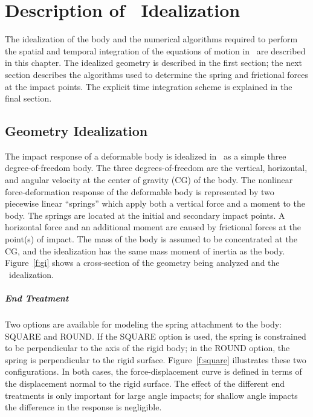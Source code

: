 \chapter{Description of \SLAP\ Idealization}\label{theory}

The idealization of the body and the numerical algorithms required to
perform the spatial and temporal integration of the equations of
motion in \SLAP\ are described in this chapter. The idealized geometry
is described in the first section; the next section describes the
algorithms used to determine the spring and frictional forces at the
impact points.  The explicit time integration scheme is explained in
the final section.

\section{Geometry Idealization}\label{s:ideal}

The impact response of a deformable body is idealized in \SLAP\ as a
simple three degree-of-freedom body.  The three degrees-of-freedom are
the vertical, horizontal, and angular velocity at the center of
gravity (CG) of the body.  The nonlinear force-deformation response of
the deformable body is represented by two piecewise linear ``springs''
which apply both a vertical force and a moment to the body.  The
springs are located at the initial and secondary impact points. A
horizontal force and an additional moment are caused by frictional
forces at the point(s) of impact.  The mass of the body is assumed to
be concentrated at the CG, and the idealization has the same mass
moment of inertia as the body. Figure~\ref{f:gi} shows a
cross-section of the geometry being analyzed and the \SLAP\
idealization.

\paragraph*{End Treatment} Two options are available for modeling
the spring attachment to the body: {\sf SQUARE}
and {\sf ROUND}.  If the {\sf SQUARE} option is used, the spring is
constrained to be perpendicular to the axis of the rigid body; in
the {\sf ROUND} option, the spring is perpendicular to the rigid
surface.  Figure~\ref{f:square} illustrates these two configurations.
In both cases, the force-displacement curve is defined in terms of the
displacement normal to the rigid surface.  The effect of the different
end treatments is only important for large angle impacts; for shallow
angle impacts the difference in the response is negligible.

